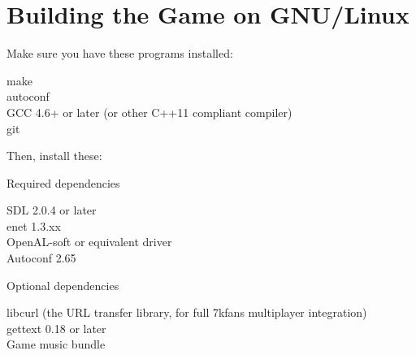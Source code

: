 




\section{Building the Game on GNU/Linux}

Make sure you have these programs installed:

\begin{adjustwidth}{1cm}{}
make \\
autoconf \\
GCC 4.6+ or later (or other C++11 compliant compiler) \\
git
\end{adjustwidth}

\clearpage
	
Then, install these:

Required dependencies

\begin{adjustwidth}{1cm}{}
SDL 2.0.4 or later \\
enet 1.3.xx \\
OpenAL-soft or equivalent driver \\
Autoconf 2.65
\end{adjustwidth}

Optional dependencies

\begin{adjustwidth}{1cm}{}
libcurl (the URL transfer library, for full 7kfans multiplayer integration) \\
gettext 0.18 or later \\
Game music bundle
\end{adjustwidth}

